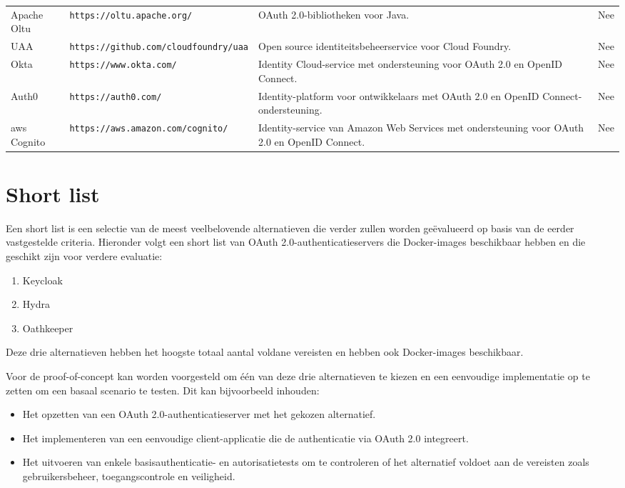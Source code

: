 \begin{table}[htbp]
\begin{adjustbox}{width=1\textwidth}
\begin{tabular}{@{}llll@{}}
    Apache Oltu   & \texttt{https://oltu.apache.org/}      & OAuth 2.0-bibliotheken voor Java.                                             & Nee                       \\
    UAA           & \texttt{https://github.com/cloudfoundry/uaa} & Open source identiteitsbeheerservice voor Cloud Foundry.                & Nee                       \\
    Okta          & \texttt{https://www.okta.com/}         & Identity Cloud-service met ondersteuning voor OAuth 2.0 en OpenID Connect.    & Nee                       \\
    Auth0         & \texttt{https://auth0.com/}            & Identity-platform voor ontwikkelaars met OAuth 2.0 en OpenID Connect-ondersteuning. & Nee                       \\
    \gls{aws} Cognito   & \texttt{https://aws.amazon.com/cognito/} & Identity-service van Amazon Web Services met ondersteuning voor OAuth 2.0 en OpenID Connect. & Nee                       \\ \bottomrule
  \end{tabular}
  \end{adjustbox}
\end{table}


\section{Short list}%
\label{sec:short-list}
Een short list is een selectie van de meest veelbelovende alternatieven die verder zullen worden geëvalueerd op basis van de eerder vastgestelde criteria. Hieronder volgt een short list van OAuth 2.0-authenticatieservers die Docker-images beschikbaar hebben en die geschikt zijn voor verdere evaluatie:
\begin{enumerate}
    \item Keycloak
    \item Hydra
    \item Oathkeeper
\end{enumerate}

Deze drie alternatieven hebben het hoogste totaal aantal voldane vereisten en hebben ook Docker-images beschikbaar.

Voor de proof-of-concept kan worden voorgesteld om één van deze drie alternatieven te kiezen en een eenvoudige implementatie op te zetten om een basaal scenario te testen. Dit kan bijvoorbeeld inhouden:

\begin{itemize}
    \item Het opzetten van een OAuth 2.0-authenticatieserver met het gekozen alternatief.
    \item Het implementeren van een eenvoudige client-applicatie die de authenticatie via OAuth 2.0 integreert.
    \item Het uitvoeren van enkele basisauthenticatie- en autorisatietests om te controleren of het alternatief voldoet aan de vereisten zoals gebruikersbeheer, toegangscontrole en veiligheid.
\end{itemize}

